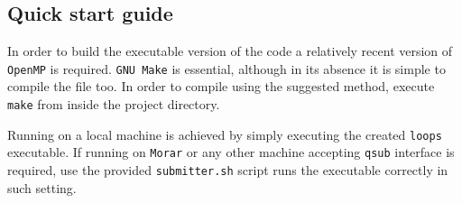 \documentclass[11pt,a4paper]{article}
\begin{document}
\begin{appendices}
\newpage
\section{Quick start guide}
In order to build the executable version of the code a relatively recent version of \texttt{OpenMP} is required.
\texttt{GNU Make} is essential, although in its absence it is simple to compile the file too.
In order to compile using the suggested method, execute \texttt{make} from inside the project directory.

Running on a local machine is achieved by simply executing the created \texttt{loops} executable.
If running on \texttt{Morar} or any other machine accepting \texttt{qsub} interface is required, use the provided \texttt{submitter.sh} script runs the executable correctly in such setting.

\end{appendices}

\label{sec:most_loaded}
\end{document}
